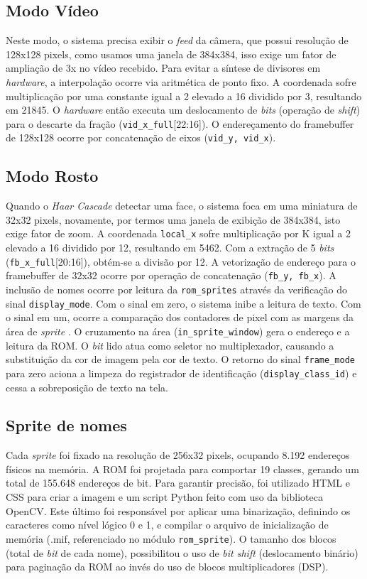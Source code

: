 \subsection{Modo Vídeo}
Neste modo, o sistema precisa exibir o \textit{feed}  da câmera, que possui resolução de 128x128 pixels, como usamos uma janela de 384x384, isso exige um fator de ampliação de 3x no vídeo recebido. Para evitar a síntese de divisores em \textit{hardware}, a interpolação ocorre via aritmética de ponto fixo. A coordenada sofre multiplicação por uma constante igual a 2 elevado a 16 dividido por 3, resultando em 21845. O \textit{hardware} então executa um deslocamento de \textit{bits}  (operação de \textit{shift}) para o descarte da fração (\texttt{vid\_x\_full}[22:16]). O endereçamento do framebuffer de 128x128 ocorre por concatenação de eixos (\texttt{vid\_y, vid\_x}).

\subsection{Modo Rosto}
Quando o \textit{Haar Cascade}  detectar uma face, o sistema foca em uma miniatura de 32x32 pixels, novamente, por termos uma janela de exibição de 384x384, isto exige fator de zoom. A coordenada \texttt{local\_x} sofre multiplicação por K igual a 2 elevado a 16 dividido por 12, resultando em 5462. Com a extração de 5 \textit{bits}  (\texttt{fb\_x\_full}[20:16]), obtém-se a divisão por 12. A vetorização de endereço para o framebuffer de 32x32 ocorre por operação de concatenação (\texttt{fb\_y, fb\_x}). A inclusão de nomes ocorre por leitura da \texttt{rom\_sprites} através da verificação do sinal \texttt{display\_mode}. Com o sinal em zero, o sistema inibe a leitura de texto. Com o sinal em um, ocorre a comparação dos contadores de pixel com as margens da área de \textit{sprite} . O cruzamento na área (\texttt{in\_sprite\_window}) gera o endereço e a leitura da ROM. O \textit{bit} lido atua como seletor no multiplexador, causando a substituição da cor de imagem pela cor de texto. O retorno do sinal \texttt{frame\_mode} para zero aciona a limpeza do registrador de identificação (\texttt{display\_class\_id}) e cessa a sobreposição de texto na tela.

\subsection{Sprite de nomes}
Cada \textit{sprite}  foi fixado na resolução de 256x32 pixels, ocupando 8.192 endereços físicos na memória. A ROM foi projetada para comportar 19 classes, gerando um total de 155.648 endereços de bit. Para garantir precisão, foi utilizado HTML e CSS para criar a imagem e um script Python feito com uso da biblioteca OpenCV. Este último foi responsável por aplicar uma binarização, definindo os caracteres como nível lógico 0 e 1, e compilar o arquivo de inicialização de memória (.mif, referenciado no módulo \texttt{rom\_sprite}). 
O tamanho dos blocos (total de 	\textit{bit} de cada nome), possibilitou o uso de 	\textit{bit shift} (deslocamento binário) para paginação da ROM ao invés do uso de blocos multiplicadores (DSP). 

